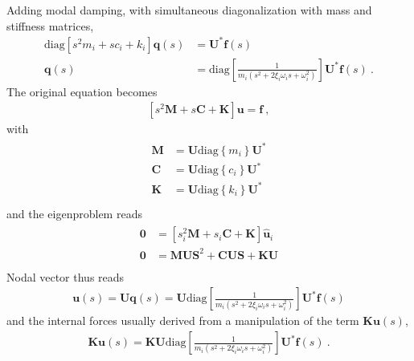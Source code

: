 \documentclass[letterpaper,10pt,english]{jupyterBook}
\begin{document}
\sphinxAtStartPar
{} Adding modal damping, with simultaneous diagonalization with mass and stiffness matrices,
\begin{equation*}
\begin{split}
  \text{diag}\left[ s^2 m_i + s c_i + k_i \right] \mathbf{q}(s) & = \mathbf{U}^* \mathbf{f}(s) \\
 \mathbf{q}(s) & = \text{diag}\left[ \frac{1}{m_i ( s^2 + 2 \xi_i \omega_i s + \omega^2_i )} \right]\mathbf{U}^* \mathbf{f}(s) \ .
\end{split}
\end{equation*}
\sphinxAtStartPar
The original equation becomes
\begin{equation*}
\begin{split}\left[s^2 \mathbf{M} + s \mathbf{C} + \mathbf{K} \right] \mathbf{u} = \mathbf{f} \ ,\end{split}
\end{equation*}
\sphinxAtStartPar
with
\begin{equation*}
\begin{split}\begin{aligned}
  \mathbf{M} & = \mathbf{U} \text{diag}\left\{ m_i \right\} \mathbf{U}^* \\
  \mathbf{C} & = \mathbf{U} \text{diag}\left\{ c_i \right\} \mathbf{U}^* \\
  \mathbf{K} & = \mathbf{U} \text{diag}\left\{ k_i \right\} \mathbf{U}^* \\
\end{aligned}\end{split}
\end{equation*}
\sphinxAtStartPar
and the eigenproblem reads
\begin{equation*}
\begin{split}\begin{aligned}
  \mathbf{0} & = \left[ s_i^2 \mathbf{M} + s_i \mathbf{C} + \mathbf{K} \right] \hat{\mathbf{u}}_i \\
  \mathbf{0} & = \mathbf{M} \mathbf{U} \mathbf{S}^2 + \mathbf{C} \mathbf{U} \mathbf{S} + \mathbf{K} \mathbf{U} \\
\end{aligned}\end{split}
\end{equation*}
\sphinxAtStartPar
{} Nodal vector thus reads
\begin{equation*}
\begin{split}\mathbf{u}(s) = \mathbf{U} \mathbf{q}(s) = \mathbf{U} \text{diag}\left[ \frac{1}{m_i ( s^2 + 2 \xi_i \omega_i s + \omega^2_i )} \right]\mathbf{U}^* \mathbf{f}(s) \end{split}
\end{equation*}
\sphinxAtStartPar
and the internal forces usually derived from a manipulation of the term \(\mathbf{K} \mathbf{u}(s)\),
\begin{equation*}
\begin{split}\mathbf{K} \mathbf{u}(s) = \mathbf{K} \mathbf{U} \text{diag}\left[ \frac{1}{m_i ( s^2 + 2 \xi_i \omega_i s + \omega^2_i )} \right]\mathbf{U}^* \mathbf{f}(s) \ .\end{split}
\end{equation*}
\end{document}
